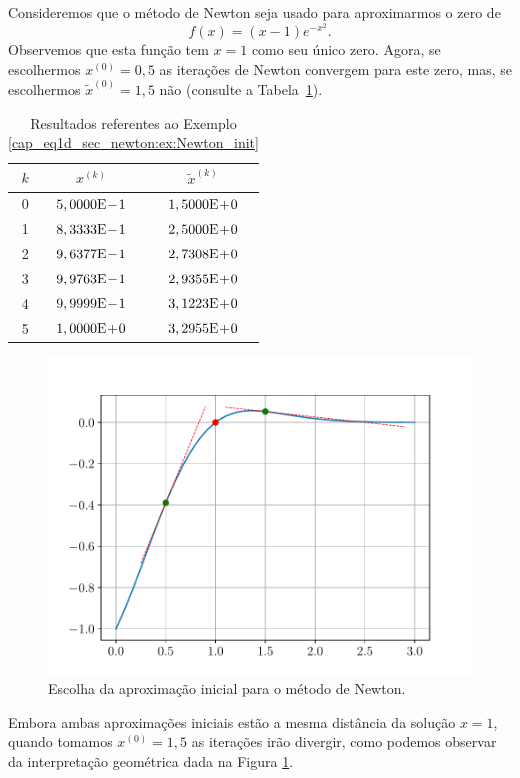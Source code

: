 \begin{ex}\label{cap_eq1d_sec_newton:ex:Newton_init}
  Consideremos que o método de Newton seja usado para aproximarmos o zero de
  \begin{equation}
    f(x) = (x-1)e^{-x^2}.
  \end{equation}
Observemos que esta função tem $x=1$ como seu único zero. Agora, se escolhermos $x^{(0)} = 0,5$ as iterações de Newton convergem para este zero, mas, se escolhermos $\tilde{x}^{(0)}=1,5$ não (consulte a Tabela~\ref{cap_eq1d_sec_newton:tab:ex_Newton_init}).

\begin{table}[H]
  \centering
  \caption{Resultados referentes ao Exemplo \ref{cap_eq1d_sec_newton:ex:Newton_init}}
  \label{cap_eq1d_sec_newton:tab:ex_Newton_init}
  \begin{tabular}{r|cc}
    $k$ & $x^{(k)}$   & $\tilde{x}^{(k)}$ \\\hline
    0 & $5,0000\mathrm{E}\!-\!1$ & $1,5000\mathrm{E}\!+\!0$ \\
    1 & $8,3333\mathrm{E}\!-\!1$ & $2,5000\mathrm{E}\!+\!0$ \\
    2 & $9,6377\mathrm{E}\!-\!1$ & $2,7308\mathrm{E}\!+\!0$ \\
    3 & $9,9763\mathrm{E}\!-\!1$ & $2,9355\mathrm{E}\!+\!0$ \\
    4 & $9,9999\mathrm{E}\!-\!1$ & $3,1223\mathrm{E}\!+\!0$ \\
    5 & $1,0000\mathrm{E}\!+\!0$ & $3,2955\mathrm{E}\!+\!0$ \\
  \end{tabular}
\end{table}

\begin{figure}[H]
  \centering
  \includegraphics[width=\textwidth]{./cap_eq1d/dados/fig_newton_ex_init/fig}
  \caption{Escolha da aproximação inicial para o método de Newton.}
  \label{cap_eq1d_sec_newton:fig:ex_Newton_init}
\end{figure}

Embora ambas aproximações iniciais estão a mesma distância da solução $x=1$, quando tomamos $x^{(0)}=1,5$ as iterações irão divergir, como podemos observar da interpretação geométrica dada na Figura \ref{cap_eq1d_sec_newton:fig:ex_Newton_init}.
\end{ex}

